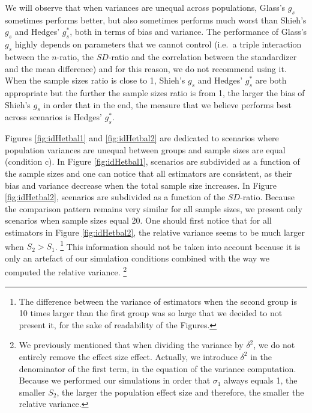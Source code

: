 \documentclass[
  english,
  man,floatsintext]{apa6}
\begin{document}
We will observe that when variances are unequal across populations, Glass's \(g_s\) sometimes performs better, but also sometimes performs much worst than Shieh's \(g_s\) and Hedges' \(g^*_s\), both in terms of bias and variance. The performance of Glass's \(g_s\) highly depends on parameters that we cannot control (i.e.~a triple interaction between the \(n\)-ratio, the \(SD\)-ratio and the correlation between the standardizer and the mean difference) and for this reason, we do not recommend using it. When the sample sizes ratio is close to 1, Shieh's \(g_s\) and Hedges' \(g^*_s\) are both appropriate but the further the sample sizes ratio is from 1, the larger the bias of Shieh's \(g_s\) in order that in the end, the measure that we believe performs best across scenarios is Hedges' \(g^*_s\).

Figures \ref{fig:idHetbal1} and \ref{fig:idHetbal2} are dedicated to scenarios where population variances are unequal between groups and sample sizes are equal (condition c). In Figure \ref{fig:idHetbal1}, scenarios are subdivided as a function of the sample sizes and one can notice that all estimators are consistent, as their bias and variance decrease when the total sample size increases. In Figure \ref{fig:idHetbal2}, scenarios are subdivided as a function of the \(SD\)-ratio. Because the comparison pattern remains very similar for all sample sizes, we present only scenarios when sample sizes equal 20. One should first notice that for all estimators in Figure \ref{fig:idHetbal2}, the relative variance seems to be much larger when \(S_2>S_1\). \footnote{The difference between the variance of estimators when the second group is 10 times larger than the first group was so large that we decided to not present it, for the sake of readability of the Figures.} This information should not be taken into account because it is only an artefact of our simulation conditions combined with the way we computed the relative variance. \footnote{We previously mentioned that when dividing the variance by $\delta^2$, we do not entirely remove the effect size effect. Actually, we introduce $\delta^2$ in the denominator of the first term, in the equation of the variance computation. Because we performed our simulations in order that $\sigma_1$ always equals 1, the smaller $S_2$, the larger the population effect size and therefore, the smaller the relative variance.}
\end{document}
